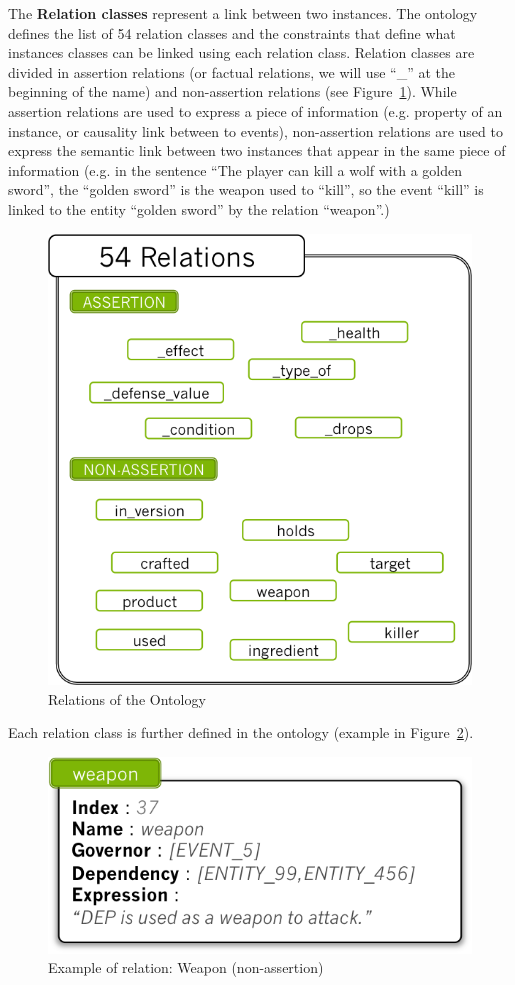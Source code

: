 \documentclass[12pt]{article}
\begin{document}
The \textbf{Relation classes} represent a link between two instances. The ontology defines the list of 54 relation classes and the constraints that define what instances classes can be linked using each relation class. Relation classes are divided in assertion relations (or factual relations, we will use ``\_'' at the beginning of the name) and non-assertion relations (see Figure~\ref{relations}). While assertion relations are used to express a piece of information (e.g. property of an instance, or causality link between to events), non-assertion relations are used to express the semantic link between two instances that appear in the same piece of information (e.g. in the sentence ``The player can kill a wolf with a golden sword'', the ``golden sword'' is the weapon used to ``kill'', so the event ``kill'' is linked to the entity ``golden sword'' by the relation ``weapon''.)

\begin{figure}[!ht]
   \centering \includegraphics[width=0.5\linewidth]{Figures/Knowledge/relations.png}
   \caption{\label{relations} Relations of the Ontology}
\end{figure}

Each relation class is further defined in the ontology (example in Figure~\ref{exampleRelation}).

\begin{figure}[!ht]
   \centering \includegraphics[width=0.6\linewidth]{Figures/Knowledge/exampleRelation.png}
   \caption{\label{exampleRelation} Example of relation: Weapon (non-assertion)}
\end{figure}
\end{document}
